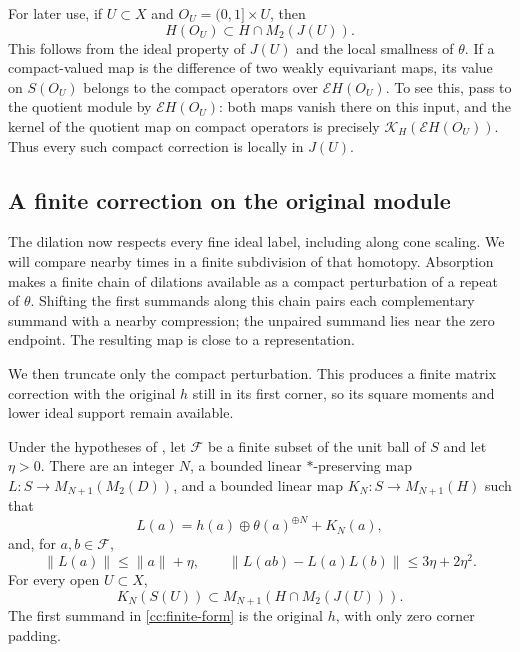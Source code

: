 For later use, if $U\subset X$ and $O_U=(0,1]\times U$, then
\begin{equation}\label{cc:local-compact-ideal}
 H(O_U)\subset H\cap M_2(J(U)).
\end{equation}
This follows from the ideal property of $J(U)$ and the local
smallness of $\theta$.  If a compact-valued map is the difference
of two weakly equivariant maps, its value on $S(O_U)$ belongs to
the compact operators over $\mathcal E H(O_U)$.  To see this,
pass to the quotient module by $\mathcal E H(O_U)$: both maps
vanish there on this input, and the kernel of the quotient map on
compact operators is precisely
$\mathcal K_H(\mathcal E H(O_U))$.  Thus every such compact
correction is locally in $J(U)$.

\subsection{A finite correction on the original module}

The dilation now respects every fine ideal label, including along
cone scaling.  We will compare nearby times in a finite subdivision of
that homotopy.  Absorption makes a finite chain of dilations available as
a compact perturbation of a repeat of $\theta$.  Shifting the first
summands along this chain pairs each complementary summand with a nearby
compression; the unpaired summand lies near the zero endpoint.  The
resulting map is close to a representation.

We then truncate only the compact perturbation.  This produces a finite
matrix correction with the original $h$ still in its first corner, so
its square moments and lower ideal support remain available.

\begin{lemma}\label{cc:finite-correction}
Under the hypotheses of , let
$\mathcal F$ be a finite subset of the unit ball of $S$ and let
$\eta>0$.  There are an integer $N$, a bounded linear
$*$-preserving map $L:S\to M_{N+1}(M_2(D))$, and a bounded linear
map $K_N:S\to M_{N+1}(H)$ such that
\begin{equation}\label{cc:finite-form}
 L(a)=h(a)\oplus\theta(a)^{\oplus N}+K_N(a),
\end{equation}
and, for $a,b\in\mathcal F$,
\begin{equation}\label{cc:finite-estimates}
 \|L(a)\|\le\|a\|+\eta,
 \qquad
 \|L(ab)-L(a)L(b)\|\le3\eta+2\eta^2.
\end{equation}
For every open $U\subset X$,
\begin{equation}\label{cc:finite-locality}
 K_N(S(U))\subset M_{N+1}(H\cap M_2(J(U))).
\end{equation}
The first summand in \eqref{cc:finite-form} is the original $h$,
with only zero corner padding.
\end{lemma}

